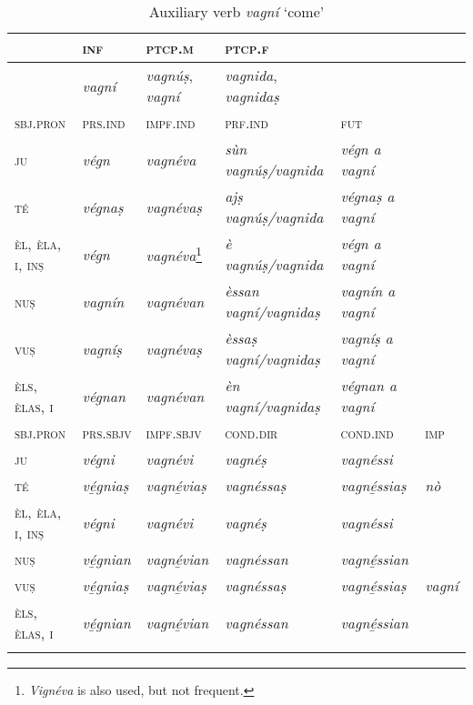 \begin{table}
\caption{Auxiliary verb \textit{vagní} `come'}
\label{tab:aux:vagní}
 \begin{tabular}{llllll} 
  \lsptoprule
& \textsc{inf}  & \textsc{ptcp.m}  & \textsc{ptcp.f}\\
  \midrule
&\textit{vagní} &\textit{vagnúṣ}, \textit{vagní} & \textit{vagnida}, \textit{vagnidaṣ}\\
   
  \lsptoprule
\textsc{sbj.pron} & \textsc{prs.ind}  &\textsc{impf.ind} & \textsc{prf.ind} & \textsc{fut}\\
   \midrule
\textsc{ju} & \textit{végn} & \textit{vagnéva} &\textit{sùn vagnúṣ/vagnida} &\textit{végn a vagní}\\
\textsc{té} &\textit{végnaṣ} &\textit{vagnévaṣ} & \textit{ajṣ vagnúṣ/vagnida} & \textit{végnaṣ a vagní}\\
\textsc{èl, èla, i, inṣ} &\textit{végn} & \textit{vagnéva}\footnote{\textit{Vignéva} is also used, but not frequent.} &\textit{è vagnúṣ/vagnida} &\textit{végn a vagní}\\
\textsc{nuṣ} &\textit{vagnín} &\textit{vagnévan} &\textit{èssan vagní/vagnidaṣ} &\textit{vagnín a vagní}\\
\textsc{vuṣ} &\textit{vagníṣ} & \textit{vagnévaṣ} &\textit{èssaṣ vagní/vagnidaṣ} &\textit{vagníṣ a vagní}\\
\textsc{èls, èlas, i}& \textit{végnan} & \textit{vagnévan} &\textit{èn vagní/vagnidaṣ} &\textit{végnan a vagní}\\

 \lsptoprule
\textsc{sbj.pron} &\textsc{prs.sbjv} & \textsc{impf.sbjv}  &\textsc{cond.dir} & \textsc{cond.ind} & \textsc{imp}\\
\midrule
\textsc{ju} & \textit{végni}& \textit{vagnévi} & \textit{vagnéṣ}& \textit{vagnéssi}\\
\textsc{té} & \textit{vé̱gniaṣ} & \textit{vagné̱viaṣ} & \textit{vagnéssaṣ} & \textit{vagné̱ssiaṣ} & \textit{nò}\\
\textsc{èl, èla, i, inṣ} & \textit{végni} & \textit{vagnévi} & \textit{vagnéṣ} & \textit{vagnéssi}\\
\textsc{nuṣ} & \textit{vé̱gnian} & \textit{vagné̱vian} & \textit{vagnéssan} & \textit{vagné̱ssian}\\
\textsc{vuṣ} & \textit{vé̱gniaṣ}& \textit{vagné̱viaṣ} & \textit{vagnéssaṣ} & \textit{vagné̱ssiaṣ} & \textit{vagní}\\
\textsc{èls, èlas, i} & \textit{vé̱gnian} & \textit{vagné̱vian}& \textit{vagnéssan} & \textit{vagné̱ssian}\\
  \lspbottomrule
 \end{tabular}
\end{table}


